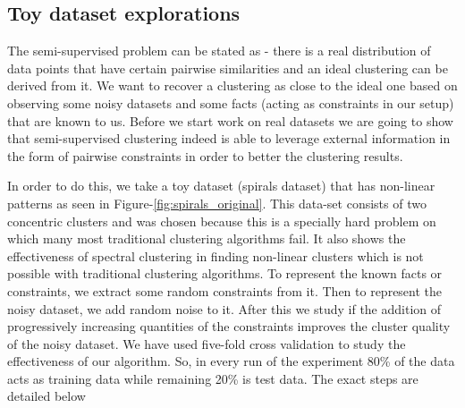 \subsection{Toy dataset explorations} \label{chap2:sec:spirals_dataset}
The semi-supervised problem can be stated as - there is a real distribution of data points that have certain pairwise similarities and an ideal clustering can be derived from it. 
We want to recover a clustering as close to the ideal one based on observing some noisy datasets and some facts (acting as constraints in our setup) that are known to us. Before we start work on real datasets 
we are going to show that semi-supervised clustering indeed is able to leverage external information in the form of pairwise constraints in order to better the clustering results. 

In order to do this, we take a toy dataset (spirals dataset) that has non-linear patterns as seen in Figure-\ref{fig:spirals_original}. This data-set consists of two concentric clusters and was chosen because this is a specially 
hard problem on which many most traditional clustering algorithms fail. It also shows the effectiveness of spectral clustering in finding non-linear clusters which is not possible with 
traditional clustering algorithms. To represent the known facts or constraints, we extract some random constraints from it. Then to represent the noisy dataset, we add random noise 
to it. After this we study if the addition of progressively increasing quantities of the constraints improves the cluster quality of the noisy dataset.
We have used five-fold cross validation to study the effectiveness of our algorithm. So, in every run of the experiment 80\% of the data acts as training data 
while remaining 20\% is test data. The exact steps are detailed below 

